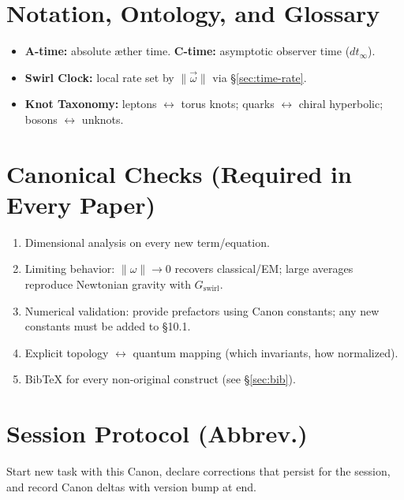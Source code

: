 \documentclass[11pt,a4paper]{article}
\begin{document}
    \section{Notation, Ontology, and Glossary}
    \begin{itemize}
        \item \textbf{A-time:} absolute æther time. \quad
        \textbf{C-time:} asymptotic observer time ($dt_{\infty}$).
        \item \textbf{Swirl Clock:} local rate set by $\lVert\vec\omega\rVert$ via \S\ref{sec:time-rate}.
        \item \textbf{Knot Taxonomy:} leptons $\leftrightarrow$ torus knots; quarks $\leftrightarrow$ chiral hyperbolic; bosons $\leftrightarrow$ unknots.
    \end{itemize}

    \section{Canonical Checks (Required in Every Paper)}
    \begin{enumerate}
        \item Dimensional analysis on every new term/equation.
        \item Limiting behavior: $\lVert\omega\rVert\to 0$ recovers classical/EM; large averages reproduce Newtonian gravity with $G_{\text{swirl}}$.
        \item Numerical validation: provide prefactors using Canon constants; any new constants must be added to \S10.1.
        \item Explicit topology $\leftrightarrow$ quantum mapping (which invariants, how normalized).
        \item BibTeX for every non-original construct (see \S\ref{sec:bib}).
    \end{enumerate}

    \section{Session Protocol (Abbrev.)}
    Start new task with this Canon, declare corrections that persist for the session, and record Canon deltas with version bump at end.

\end{document}
